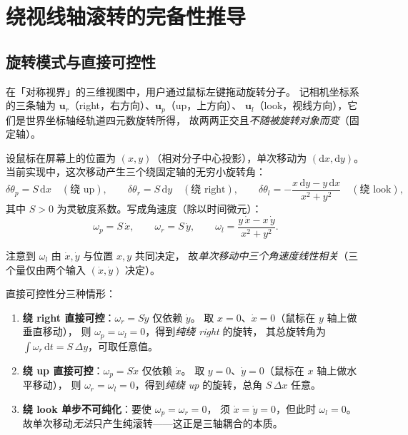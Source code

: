 
\section{绕视线轴滚转的完备性推导}

\subsection{旋转模式与直接可控性}

在「对称视界」的三维视图中，用户通过鼠标左键拖动旋转分子。
记相机坐标系的三条轴为 $\mathbf{u}_r$（right，右方向）、$\mathbf{u}_p$（up，上方向）、
$\mathbf{u}_l$（look，视线方向），它们是世界坐标轴经轨道四元数旋转所得，
故两两正交且\emph{不随被旋转对象而变}（固定轴）。

设鼠标在屏幕上的位置为 $(x,y)$（相对分子中心投影），单次移动为 $(\mathrm{d}x,\mathrm{d}y)$。
当前实现中，这次移动产生三个绕固定轴的无穷小旋转角：
\begin{equation}
  \delta\theta_p = S\,\mathrm{d}x \quad(\text{绕 up}),\qquad
  \delta\theta_r = S\,\mathrm{d}y \quad(\text{绕 right}),\qquad
  \delta\theta_l = -\frac{x\,\mathrm{d}y - y\,\mathrm{d}x}{x^2+y^2} \quad(\text{绕 look}),
\end{equation}
其中 $S>0$ 为灵敏度系数。写成角速度（除以时间微元）：
\begin{equation}
  \omega_p = S\,\dot x,\qquad
  \omega_r = S\,\dot y,\qquad
  \omega_l = \frac{y\,\dot x - x\,\dot y}{x^2+y^2}.
\end{equation}

\noindent 注意到 $\omega_l$ 由 $\dot x, \dot y$ 与位置 $x,y$ 共同决定，
故\emph{单次移动中三个角速度线性相关}（三个量仅由两个输入 $(\dot x,\dot y)$ 决定）。

直接可控性分三种情形：

\begin{enumerate}
  \item \textbf{绕 right 直接可控}：$\omega_r = S\dot y$ 仅依赖 $\dot y$。
    取 $x = 0$、$\dot x = 0$（鼠标在 $y$ 轴上做垂直移动），
    则 $\omega_p = \omega_l = 0$，得到\emph{纯绕 right} 的旋转，
    其总旋转角为 $\int \omega_r\,\mathrm{d}t = S\,\Delta y$，可取任意值。

  \item \textbf{绕 up 直接可控}：$\omega_p = S\dot x$ 仅依赖 $\dot x$。
    取 $y = 0$、$\dot y = 0$（鼠标在 $x$ 轴上做水平移动），
    则 $\omega_r = \omega_l = 0$，得到\emph{纯绕 up} 的旋转，总角 $S\,\Delta x$ 任意。

  \item \textbf{绕 look 单步不可纯化}：要使 $\omega_p = \omega_r = 0$，
    须 $\dot x = \dot y = 0$，但此时 $\omega_l = 0$。
    故单次移动\emph{无法}只产生纯滚转——这正是三轴耦合的本质。
\end{enumerate}

